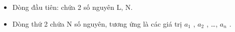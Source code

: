 \begin{itemize}
	\item     Dòng đầu tiên: chứa 2 số nguyên L, N.   
	\item     Dòng thứ 2 chứa N số nguyên, tương ứng là các giá trị $a_{1}$    , $a_{2}$    , …, $a_{n}$    .   
\end{itemize}